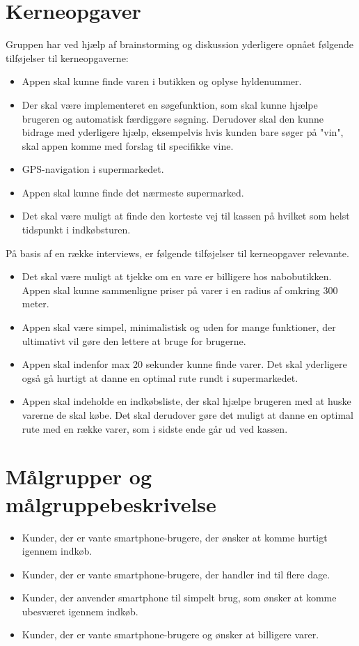 \documentclass[12pt]{article}
\begin{document}
\newpage

\section{Kerneopgaver}

\noindent Gruppen har ved hjælp af brainstorming og diskussion yderligere opnået følgende tilføjelser til kerneopgaverne:

\begin{itemize}
\item Appen skal kunne finde varen i butikken og oplyse hyldenummer.
\item Der skal være implementeret en søgefunktion, som skal kunne hjælpe brugeren og automatisk færdiggøre søgning. Derudover skal den kunne bidrage med yderligere hjælp, eksempelvis hvis kunden bare søger på "vin", skal appen komme med forslag til specifikke vine.
\item GPS-navigation i supermarkedet.
\item Appen skal kunne finde det nærmeste supermarked.
\item Det skal være muligt at finde den korteste vej til kassen på hvilket som helst tidspunkt i indkøbsturen.
\end{itemize}

\noindent På basis af en række interviews, er følgende tilføjelser til kerneopgaver relevante.

\begin{itemize}
\item Det skal være muligt at tjekke om en vare er billigere hos nabobutikken. Appen skal kunne sammenligne priser på varer i en radius af omkring 300 meter.
\item Appen skal være simpel, minimalistisk og uden for mange funktioner, der ultimativt vil gøre den lettere at bruge for brugerne.
\item Appen skal indenfor max 20 sekunder kunne finde varer. Det skal yderligere også gå hurtigt at danne en optimal rute rundt i supermarkedet.
\item Appen skal indeholde en indkøbsliste, der skal hjælpe brugeren med at huske varerne de skal købe. Det skal derudover gøre det muligt at danne en optimal rute med en række varer, som i sidste ende går ud ved kassen.
\end{itemize}

\section{Målgrupper og målgruppebeskrivelse}
\begin{itemize}
\item Kunder, der er vante smartphone-brugere, der ønsker at komme hurtigt igennem indkøb.
\item Kunder, der er vante smartphone-brugere, der handler ind til flere dage.
\item Kunder, der anvender smartphone til simpelt brug, som ønsker at komme ubesværet igennem indkøb.
\item Kunder, der er vante smartphone-brugere og ønsker at billigere varer.
\end{itemize}
\end{document}
